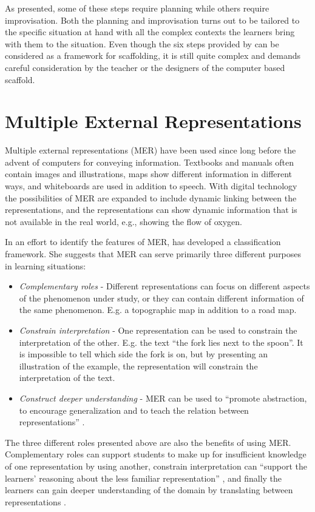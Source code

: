 As presented, some of these steps require planning while others require improvisation. Both the planning and improvisation turns out to be tailored to the specific situation at hand with all the complex contexts the learners bring with them to the situation. Even though the six steps provided by \citet{wood1976role} can be considered as a framework for scaffolding, it is still quite complex and demands careful consideration by the teacher or the designers of the computer based scaffold.  

\section{Multiple External Representations}
Multiple external representations (MER) have been used since long before the advent of computers for conveying information. Textbooks and manuals often contain images and illustrations, maps show different information in different ways, and whiteboards are used in addition to speech. With digital technology the possibilities of MER are expanded to include dynamic linking between the representations, and the representations can show dynamic information that is not available in the real world, e.g., showing the flow of oxygen. 

In an effort to identify the features of MER, \citet{ainsworth1999functions} has developed a classification framework. She suggests that MER can serve primarily three different purposes in learning situations:
\begin{itemize}
\item{} \emph{Complementary roles} - Different representations can focus on different aspects of the phenomenon under study, or they can contain different information of the same phenomenon. E.g. a topographic map in addition to a road map. 
\item{} \emph{Constrain interpretation} - One representation can be used to constrain the interpretation of the other. E.g. the text “the fork lies next to the spoon”. It is impossible to tell which side the fork is on, but by presenting an illustration of the example, the representation will constrain the interpretation of the text. 
\item{} \emph{Construct deeper understanding} - MER can be used to “promote abstraction, to encourage generalization and to teach the relation between representations” \citep{ainsworth1999functions}. 
\end{itemize}

The three different roles presented above are also the benefits of using MER. Complementary roles can support students to make up for insufficient knowledge of one representation by using another, constrain interpretation can “support the learners’ reasoning about the less familiar representation” \citet{ainsworth1999functions}, and finally the learners can gain deeper understanding of the domain by translating between representations \citep{van2006supporting}. 


